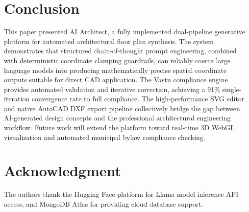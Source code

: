 \documentclass[10pt, twocolumn, letterpaper]{article}
\begin{document}
  \section{Conclusion}

  This paper presented AI Architect, a fully implemented dual-pipeline
  generative platform for automated architectural floor plan synthesis. The
  system demonstrates that structured chain-of-thought prompt engineering,
  combined with deterministic coordinate clamping guardrails, can reliably coerce
  large language models into producing mathematically precise spatial coordinate
  outputs suitable for direct CAD application. The Vastu compliance engine
  provides automated validation and iterative correction, achieving a 91\%
  single-iteration convergence rate to full compliance. The high-performance
  SVG editor and native AutoCAD DXF export pipeline collectively bridge the gap
  between AI-generated design concepts and the professional architectural
  engineering workflow. Future work will extend the platform toward real-time 3D
  WebGL visualization and automated municipal bylaw compliance checking.

  \section*{Acknowledgment}
  The authors thank the Hugging Face platform for Llama model inference API
  access, and MongoDB Atlas for providing cloud database support.

  \balance
\end{document}
